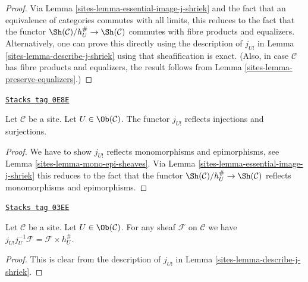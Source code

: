 \begin{proof}

Via Lemma \ref{sites-lemma-essential-image-j-shriek}
and the fact that an equivalence of categories commutes
with all limits, this reduces to the fact that the functor
$\Sh(\mathcal{C})/h_U^\# \rightarrow \Sh(\mathcal{C})$
commutes with fibre products and equalizers. Alternatively, one can
prove this directly using the description of $j_{U!}$ in
Lemma \ref{sites-lemma-describe-j-shriek}
using that sheafification is exact. (Also, in case $\mathcal{C}$ has
fibre products and equalizers, the result follows from
Lemma \ref{sites-lemma-preserve-equalizers}.)
\end{proof}

\begin{lemma}
\label{sites-lemma-j-shriek-reflects-injections-surjections}
\href{https://stacks.math.columbia.edu/tag/0E8E}{\texttt{Stacks tag 0E8E}}

Let $\mathcal{C}$ be a site. Let $U \in \Ob(\mathcal{C})$.
The functor $j_{U!}$ reflects injections and surjections.
\end{lemma}

\begin{proof}

We have to show $j_{U!}$ reflects monomorphisms and epimorphisms, see
Lemma \ref{sites-lemma-mono-epi-sheaves}.
Via Lemma \ref{sites-lemma-essential-image-j-shriek}
this reduces to the fact that the functor
$\Sh(\mathcal{C})/h_U^\# \to \Sh(\mathcal{C})$
reflects monomorphisms and epimorphisms.
\end{proof}

\begin{lemma}
\label{sites-lemma-compute-j-shriek-restrict}
\href{https://stacks.math.columbia.edu/tag/03EE}{\texttt{Stacks tag 03EE}}

Let $\mathcal{C}$ be a site. Let $U \in \Ob(\mathcal{C})$.
For any sheaf $\mathcal{F}$ on $\mathcal{C}$ we have
$j_{U!}j_U^{-1}\mathcal{F} = \mathcal{F} \times h_U^\#$.
\end{lemma}

\begin{proof}

This is clear from the description of $j_{U!}$ in
Lemma \ref{sites-lemma-describe-j-shriek}.
\end{proof}

